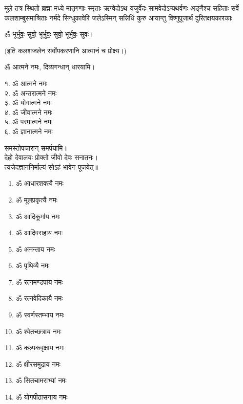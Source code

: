 {मूले तत्र स्थितो ब्रह्मा मध्ये मातृगणाः स्मृताः}
{ऋग्वेदोऽथ यजुर्वेदः सामवेदोऽप्यथर्वणः}
{अङ्गैश्च सहिताः सर्वे कलशाम्बुसमाश्रिताः}
{नर्मदे सिन्धुकावेरि जलेऽस्मिन् सन्निधिं कुरु}
{आयान्तु विष्णुपूजार्थं दुरितक्षयकारकाः}

\centerline{ॐ भूर्भुवः॒ सुवो॒ भूर्भुवः॒ सुवो॒ भूर्भुवः॒ सुवः॑।}

(इति कलशजलेन सर्वोपकरणानि आत्मानं च प्रोक्ष्य।)

ॐ आत्मने नमः, दिव्यगन्धान् धारयामि।
\begin{multicols}{2}
१. ॐ आत्मने नमः\\
२. ॐ अन्तरात्मने नमः\\
३. ॐ योगात्मने नमः\\
४. ॐ जीवात्मने नमः\\
५. ॐ परमात्मने नमः\\
६. ॐ ज्ञानात्मने नमः
\end{multicols}
समस्तोपचारान् समर्पयामि।\\

देहो देवालयः प्रोक्तो जीवो देवः सनातनः।\\
त्यजेदज्ञाननिर्माल्यं सोऽहं भावेन पूजयेत्॥\\

\begin{multicols}{2}
\begin{enumerate}
\item ॐ आधारशक्त्यै नमः
\item ॐ मूलप्रकृत्यै नमः
\item ॐ आदिकूर्माय नमः 
\item ॐ आदिवराहाय नमः
\item ॐ अनन्ताय नमः
\item ॐ पृथिव्यै नमः
\item ॐ रत्नमण्डपाय नमः
\item ॐ रत्नवेदिकायै नमः
\item ॐ स्वर्णस्तम्भाय नमः
\item ॐ श्वेतच्छत्राय नमः
\item ॐ कल्पकवृक्षाय नमः
\item ॐ क्षीरसमुद्राय नमः 
\item ॐ सितचामराभ्यां नमः
\item ॐ योगपीठासनाय नमः
\end{enumerate}
\end{multicols}

